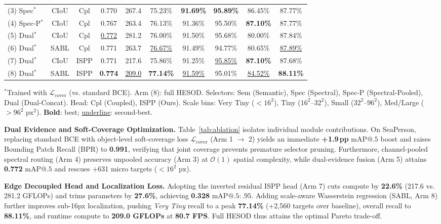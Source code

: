 \begin{table}[t]
{\begin{tabular}{lcc|cc|ccccc}
(3) Spec$^*$   & CIoU & Cpl  & 0.770 & 267.4 & 75.23\% & \textbf{91.69\%} & \textbf{95.89\%} & 86.45\% & 87.77\% \\
(4) Spec-P$^*$ & CIoU & Cpl  & 0.767 & 263.4 & 76.13\% & 91.36\% & 95.50\% & \textbf{87.10\%} & 87.77\% \\
(5) Dual$^*$   & CIoU & Cpl  & \underline{0.772} & 281.2 & 76.00\% & 91.50\% & 95.68\% & 80.00\% & 87.84\% \\
(6) Dual$^*$   & SABL & Cpl  & 0.771 & 263.7 & \underline{76.67\%} & 91.49\% & 94.77\% & 80.65\% & \underline{87.89\%} \\
(7) Dual$^*$   & CIoU & ISPP & 0.771 & 217.6 & 75.86\% & 91.25\% & \underline{95.85\%} & \textbf{87.10\%} & 87.68\% \\
(8) Dual$^*$   & SABL & ISPP & \textbf{0.774} & \underline{209.0} & \textbf{77.14\%} & \underline{91.59\%} & 95.01\% & \underline{84.52\%} & \textbf{88.11\%} \\
\bottomrule
\end{tabular}
}
\vspace{0.8mm}
\parbox{\columnwidth}{\scriptsize $^*$Trained with $\mathcal{L}_{\mathrm{cover}}$ (vs. standard BCE). Arm (8): full HESOD. Selectors: Sem (Semantic), Spec (Spectral), Spec-P (Spectral-Pooled), Dual (Dual-Concat). Head: Cpl (Coupled), ISPP (Ours). Scale bins: Very Tiny ($<16^2$), Tiny ($16^2\text{--}32^2$), Small ($32^2\text{--}96^2$), Med/Large ($>96^2\text{ px}^2$). \textbf{Bold}: best; \underline{underline}: second-best.}
\end{table}

\textbf{Dual Evidence and Soft-Coverage Optimization.} Table~\ref{tab:ablation} isolates individual module contributions. On SeaPerson, replacing standard BCE with object-level soft-coverage loss $\mathcal{L}_{\mathrm{cover}}$ (Arm 1 $\to$ 2) yields an immediate \textbf{+1.9\,pp} $\mathrm{mAP@.5}$ boost and raises Bounding Patch Recall (BPR) to \textbf{0.991}, verifying that joint coverage prevents premature selector pruning. Furthermore, channel-pooled spectral routing (Arm 4) preserves unpooled accuracy (Arm 3) at $\mathcal{O}(1)$ spatial complexity, while dual-evidence fusion (Arm 5) attains \textbf{0.772} $\mathrm{mAP@.5}$ and rescues +631 micro targets ($<16^2\text{ px}$).

\textbf{Edge Decoupled Head and Localization Loss.} Adopting the inverted residual ISPP head (Arm 7) cuts compute by \textbf{22.6\%} (217.6 vs. 281.2 GFLOPs) and trims parameters by \textbf{27.6\%}, achieving \textbf{0.328} $\mathrm{mAP@.5:.95}$. Adding scale-aware Wasserstein regression (SABL, Arm 8) further improves sub-16px localization, pushing \emph{Very Tiny} recall to a peak \textbf{77.14\%} (+2,560 targets over baseline), overall recall to \textbf{88.11\%}, and runtime compute to \textbf{209.0 GFLOPs} at \textbf{80.7 FPS}. Full HESOD thus attains the optimal Pareto trade-off.

